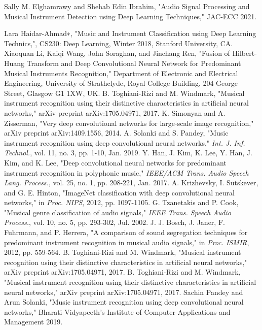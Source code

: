 \documentclass[conference]{IEEEtran}
\begin{document}
\begin{thebibliography}{6}
Sally M. Elghamrawy and Shehab Edin Ibrahim, "Audio Signal Processing and Musical Instrument
Detection using Deep Learning Techniques," JAC-ECC 2021.

Lara Haidar-Ahmad∗, "Music and Instrument Classification using Deep
Learning Technics,", CS230: Deep Learning, Winter 2018, Stanford University, CA.
Xiaoquan Li, Kaiqi Wang, John Soraghan, and Jinchang Ren, "Fusion of Hilbert-Huang Transform and Deep
Convolutional Neural Network
for Predominant Musical Instruments
Recognition," Department of Electronic and Electrical Engineering, University of Strathclyde,
Royal College Building, 204 George Street, Glasgow G1 1XW, UK.
B. Toghiani-Rizi and M. Windmark, "Musical instrument recognition using their distinctive characteristics in artificial neural networks," arXiv preprint arXiv:1705.04971, 2017.
K. Simonyan and A. Zisserman, "Very deep convolutional networks for large-scale image recognition," arXiv preprint arXiv:1409.1556, 2014.
A. Solanki and S. Pandey, "Music instrument recognition using deep convolutional neural networks," \emph{Int. J. Inf. Technol.}, vol. 11, no. 3, pp. 1-10, Jan. 2019.
Y. Han, J. Kim, K. Lee, Y. Han, J. Kim, and K. Lee, "Deep convolutional neural networks for predominant instrument recognition in polyphonic music," \emph{IEEE/ACM Trans. Audio Speech Lang. Process.}, vol. 25, no. 1, pp. 208-221, Jan. 2017.
A. Krizhevsky, I. Sutskever, and G. E. Hinton, "ImageNet classification with deep convolutional neural networks," in \emph{Proc. NIPS}, 2012, pp. 1097-1105.
G. Tzanetakis and P. Cook, "Musical genre classification of audio signals," \emph{IEEE Trans. Speech Audio Process.}, vol. 10, no. 5, pp. 293-302, Jul. 2002.
J. J. Bosch, J. Janer, F. Fuhrmann, and P. Herrera, "A comparison of sound segregation techniques for predominant instrument recognition in musical audio signals," in \emph{Proc. ISMIR}, 2012, pp. 559-564.
B. Toghiani-Rizi and M. Windmark, "Musical instrument recognition using their distinctive characteristics in artificial neural networks," arXiv preprint arXiv:1705.04971, 2017.
B. Toghiani-Rizi and M. Windmark, "Musical instrument recognition using their distinctive characteristics in artificial neural networks," arXiv preprint arXiv:1705.04971, 2017.
Sachin Pandey and Arun Solanki, "Music instrument recognition using deep convolutional neural networks,"  Bharati Vidyapeeth’s Institute of Computer Applications and Management 2019.
\end{thebibliography}
\end{document}
